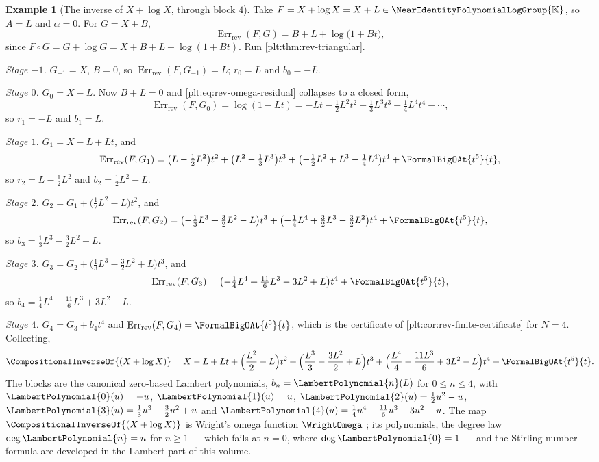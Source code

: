 \documentclass[11pt,oneside]{article}
\theoremstyle{plain}
\theoremstyle{definition}
\newtheorem{example}[theorem]{Example}
\theoremstyle{remark}
\newcommand{\K}{\mathbb{K}}
\newcommand{\Gnear}{\NearIdentityPolynomialLogGroup{\K}} %
\newcommand{\compose}{\mathbin{\circ}}
\newcommand{\rev}[1]{\CompositionalInverseOf{#1}}
\newcommand{\LamP}[1]{\LambertPolynomial{#1}}
\newcommand{\RevErr}[2]{\operatorname{Err}_{\mathrm{rev}}\!\left(#1,#2\right)}
\begin{document}
\begin{example}[The inverse of \(X+\log X\), through block \(4\)]
\label{plt:ex:rev-omega}
Take \(F=X+\log X=X+L\in\Gnear\), so \(A=L\) and \(\alpha=0\).  For \(G=X+B\),
\begin{equation}\label{plt:eq:rev-omega-residual}
 \RevErr{F}{G}=B+L+\log\bigl(1+Bt\bigr),
\end{equation}
since \(F\compose G=G+\log G=X+B+L+\log(1+Bt)\).  Run
\cref{plt:thm:rev-triangular}.

\emph{Stage \(-1\).}  \(G_{-1}=X\), \(B=0\), so \(\RevErr{F}{G_{-1}}=L\);
\(r_0=L\) and \(b_0=-L\).

\emph{Stage \(0\).}  \(G_0=X-L\).  Now \(B+L=0\) and
\eqref{plt:eq:rev-omega-residual} collapses to a closed form,
\[
 \RevErr{F}{G_0}=\log(1-Lt)
 =-Lt-\tfrac12L^2t^2-\tfrac13L^3t^3-\tfrac14L^4t^4-\cdots,
\]
so \(r_1=-L\) and \(b_1=L\).

\emph{Stage \(1\).}  \(G_1=X-L+Lt\), and
\[
 \RevErr{F}{G_1}
 =\bigl(L-\tfrac12L^2\bigr)t^2
 +\bigl(L^2-\tfrac13L^3\bigr)t^3
 +\bigl(-\tfrac12L^2+L^3-\tfrac14L^4\bigr)t^4
 +\FormalBigOAt{t^{5}}{t},
\]
so \(r_2=L-\tfrac12L^2\) and \(b_2=\tfrac12L^2-L\).

\emph{Stage \(2\).}  \(G_2=G_1+\bigl(\tfrac12L^2-L\bigr)t^2\), and
\[
 \RevErr{F}{G_2}
 =\bigl(-\tfrac13L^3+\tfrac32L^2-L\bigr)t^3
 +\bigl(-\tfrac14L^4+\tfrac32L^3-\tfrac32L^2\bigr)t^4
 +\FormalBigOAt{t^{5}}{t},
\]
so \(b_3=\tfrac13L^3-\tfrac32L^2+L\).

\emph{Stage \(3\).}  \(G_3=G_2+\bigl(\tfrac13L^3-\tfrac32L^2+L\bigr)t^3\), and
\[
 \RevErr{F}{G_3}
 =\bigl(-\tfrac14L^4+\tfrac{11}6L^3-3L^2+L\bigr)t^4
 +\FormalBigOAt{t^{5}}{t},
\]
so \(b_4=\tfrac14L^4-\tfrac{11}6L^3+3L^2-L\).

\emph{Stage \(4\).}  \(G_4=G_3+b_4t^4\) and
\(\RevErr{F}{G_4}=\FormalBigOAt{t^{5}}{t}\), which is the certificate of
\cref{plt:cor:rev-finite-certificate} for \(N=4\).  Collecting,
\begin{equation}\label{plt:eq:rev-omega-expansion}
 \rev{(X+\log X)}
 =X-L+Lt+\Bigl(\frac{L^2}2-L\Bigr)t^2
 +\Bigl(\frac{L^3}3-\frac{3L^2}2+L\Bigr)t^3
 +\Bigl(\frac{L^4}4-\frac{11L^3}6+3L^2-L\Bigr)t^4
 +\FormalBigOAt{t^{5}}{t}.
\end{equation}
The blocks are the canonical zero-based Lambert polynomials,
\(b_n=\LamP{n}(L)\) for \(0\le n\le4\), with \(\LamP{0}(u)=-u\),
\(\LamP{1}(u)=u\), \(\LamP{2}(u)=\tfrac12u^2-u\),
\(\LamP{3}(u)=\tfrac13u^3-\tfrac32u^2+u\) and
\(\LamP{4}(u)=\tfrac14u^4-\tfrac{11}6u^3+3u^2-u\).  The map
\(\rev{(X+\log X)}\) is Wright's omega function \(\WrightOmega\)
\cite{corless-et-al-1996,wright-omega}; its polynomials, the degree law
\(\deg\LamP{n}=n\) for \(n\ge1\) --- which fails at \(n=0\), where
\(\deg\LamP{0}=1\) --- and the Stirling-number formula are developed in the
Lambert part of this volume.
\end{example}
\end{document}
